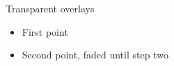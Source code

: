 \documentclass{beamer}
\begin{document}
\begin{frame}{Transparent overlays}
  \begin{itemize}
    \item First point
    \item<2-> Second point, faded until step two
  \end{itemize}
\end{frame}
\end{document}
